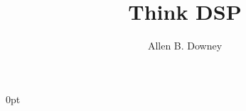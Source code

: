 \documentclass[12pt]{book}
\title{Think DSP}
\author{Allen B. Downey}
\newif\ifplastex
\begin{document}
\frontmatter

\ifplastex

\else
\fi

\ifplastex
    \usepackage{localdef}
    \maketitle

\else

  {\topsep}%
  {\topsep}%
  {}%
  {0pt}%
  {\bfseries}%
  {}%
  { }%
  {}%

\theoremstyle{exercise}
\newtheorem{exercise}{Exercise}[chapter]


\end{document}
